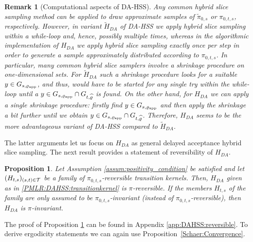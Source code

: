 \documentclass[sn-mathphys-num]{sn-jnl}%
\theoremstyle{thmstyleone}%
\newtheorem{proposition}[theorem]{Proposition}%
\theoremstyle{thmstyletwo}%
\newtheorem{remark}{Remark}%
\theoremstyle{thmstylethree}%
\newcommand{\rhoapp}{\varrho_{{\rm app}}}
\newcommand{\change}[1]{\bgroup\color{black}#1\egroup}    %
\begin{document}
\begin{remark}[Computational aspects of DA-HSS]
Any common hybrid slice sampling method can be applied to draw approximate samples of $\widetilde{\pi}_{0,s}$ or $\pi_{0,t,s}$, respectively. 
However, in variant $\widetilde{H}_{DA}$ of DA-HSS we apply hybrid slice sampling within a while-loop and, hence, possibly multiple times, whereas in the algorithmic implementation of $H_{DA}$ we apply hybrid slice sampling exactly once per step in order to generate a sample approximately distributed according to $\pi_{0,t,s}$.
In particular, many common hybrid slice samplers involve a shrinkage procedure on one-dimensional sets. 
For $\widetilde{H}_{DA}$ such a shrinkage procedure looks for a suitable $y \in G_{s,\rhoapp}$, and thus, would have to be started for any single try within the while-loop until a $y \in G_{s,\rhoapp} \cap  G_{t,\widehat{\varrho}}$ is found.
On the other hand, for $H_{DA}$ we can apply a single shrinkage procedure: firstly find $y \in G_{s,\rhoapp}$ and then apply the shrinkage a bit further until we obtain $y \in G_{s,\rhoapp} \cap  G_{t,\widehat{\varrho}}$.
Therefore, $H_{DA}$ seems to be the more advantageous variant of DA-HSS compared to $\widetilde{H}_{DA}$.
\end{remark}

The latter arguments let us focus on $H_{DA}$ as general delayed acceptance hybrid slice sampling. The next result provides a statement of reversibility of $H_{DA}$.

\begin{proposition}\label{prop:DAHSS:reversible}
Let Assumption \ref{assum:positivity_condition} be satisfied and let $(H_{t,s})_{\change{(s,t)\in \mathcal T}}$ be a family of $\pi_{0,t,s}$-reversible transition kernels. Then, $H_{DA}$ given as in \eqref{PMLR:DAHSS:transitionkernel} is $\pi$-reversible. If 
the members 
$H_{t,s}$ of the family are only assumed to be $\pi_{0,t,s}$-invariant (instead of $\pi_{0,t,s}$-reversible), then $H_{DA}$ is $\pi$-invariant.   
\end{proposition}
The proof of Proposition \ref{prop:DAHSS:reversible} can be found in Appendix \ref{app:DAHSS:reversible}.
To derive ergodicity statements we can again use Proposition~\ref{Schaer:Convergence}.
\end{document}

